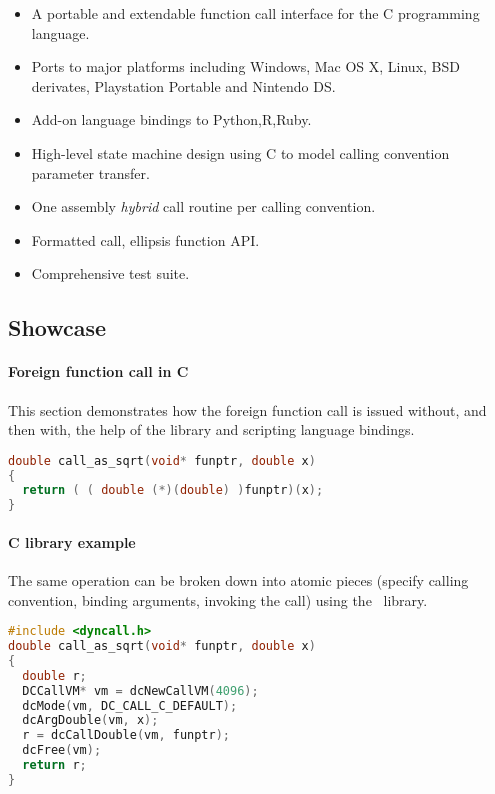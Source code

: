 \begin{itemize}
\item A portable and extendable function call interface for the C programming 
language.
\item Ports to major platforms including Windows, Mac OS X, Linux, BSD derivates, Playstation Portable and Nintendo DS.
\item Add-on language bindings to Python,R,Ruby.
\item High-level state machine design using C to model calling convention
parameter transfer.
\item One assembly \emph{hybrid} call routine per calling convention.
\item Formatted call, ellipsis function API.
\item Comprehensive test suite.
\end{itemize}

\pagebreak

\subsection{Showcase}

\paragraph{Foreign function call in C}
This section demonstrates how the foreign function call is issued without, and then 
with, the help of the  library and scripting language
bindings.

\begin{lstlisting}[language=c,caption=Foreign function call in C]
double call_as_sqrt(void* funptr, double x)
{
  return ( ( double (*)(double) )funptr)(x);
}
\end{lstlisting}

\paragraph{ C library example}

The same operation can be broken down into atomic pieces 
(specify calling convention, binding arguments, invoking the call)
using the \dc\ library.

\begin{lstlisting}[language=c,caption=Dyncall C library example]
#include <dyncall.h>
double call_as_sqrt(void* funptr, double x)
{
  double r;
  DCCallVM* vm = dcNewCallVM(4096);
  dcMode(vm, DC_CALL_C_DEFAULT);
  dcArgDouble(vm, x);  
  r = dcCallDouble(vm, funptr);
  dcFree(vm);
  return r;
}
\end{lstlisting}

